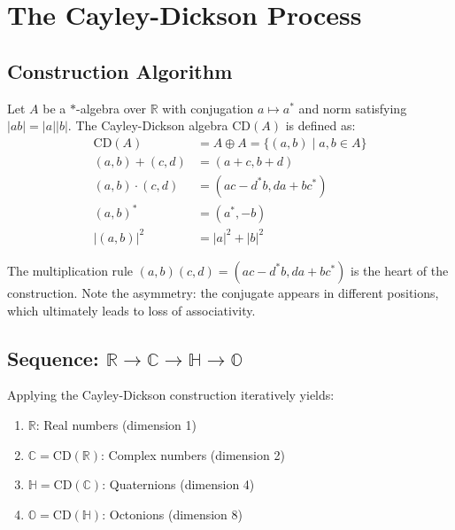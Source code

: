 \section{The Cayley-Dickson Process}

\subsection{Construction Algorithm}

\begin{definition}
Let $A$ be a $*$-algebra over $\mathbb{R}$ with conjugation $a \mapsto a^*$ and norm satisfying $|ab| = |a||b|$. The Cayley-Dickson algebra $\mathrm{CD}(A)$ is defined as:
\begin{align}
    \mathrm{CD}(A) &= A \oplus A = \{(a,b) \mid a, b \in A\} \\
    (a,b) + (c,d) &= (a+c, b+d) \\
    (a,b) \cdot (c,d) &= (ac - d^*b, da + bc^*) \\
    (a,b)^* &= (a^*, -b) \\
    |(a,b)|^2 &= |a|^2 + |b|^2
\end{align}
\end{definition}

The multiplication rule $(a,b)(c,d) = (ac - d^*b, da + bc^*)$ is the heart of the construction. Note the asymmetry: the conjugate appears in different positions, which ultimately leads to loss of associativity.

\subsection{Sequence: $\mathbb{R} \to \mathbb{C} \to \mathbb{H} \to \mathbb{O}$}

\begin{theorem}
Applying the Cayley-Dickson construction iteratively yields:
\begin{enumerate}
    \item $\mathbb{R}$: Real numbers (dimension 1)
    \item $\mathbb{C} = \mathrm{CD}(\mathbb{R})$: Complex numbers (dimension 2)
    \item $\mathbb{H} = \mathrm{CD}(\mathbb{C})$: Quaternions (dimension 4)
    \item $\mathbb{O} = \mathrm{CD}(\mathbb{H})$: Octonions (dimension 8)
\end{enumerate}
\end{theorem}

